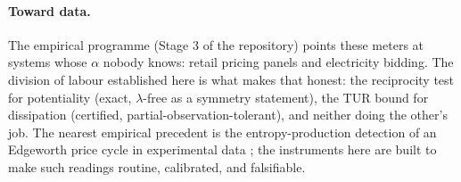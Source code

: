 \paragraph{Toward data.} The empirical programme (Stage 3 of the repository)
points these meters at systems whose $\alpha$ nobody knows: retail pricing
panels and electricity bidding. The division of labour established here is
what makes that honest: the reciprocity test for potentiality (exact,
$\lambda$-free as a symmetry statement), the TUR bound for dissipation
(certified, partial-observation-tolerant), and neither doing the other's job.
The nearest empirical precedent is the entropy-production detection of an
Edgeworth price cycle in experimental data \citep{xu2011}; the instruments
here are built to make such readings routine, calibrated, and falsifiable.
